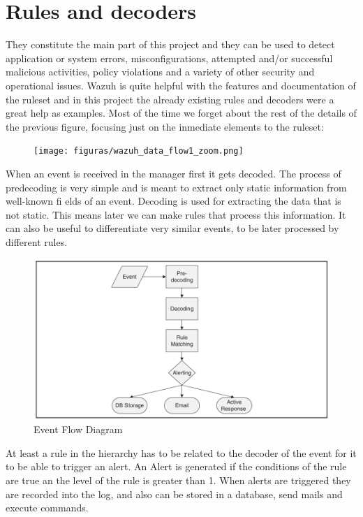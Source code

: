 \section{Rules and decoders}
They constitute the main part of this project and they can be used to detect application or system errors, misconfigurations, attempted and/or successful malicious activities, policy violations and a variety of other security and operational issues\cite{wazuh_index}. Wazuh is quite helpful with the features and documentation of the ruleset and in this project the already existing rules and decoders were a great help as examples.
\linej
\linej
Most of the time we forget about the rest of the details of the previous figure, focusing just on the inmediate elements to the ruleset:
\begin{figure}[H]
  \centering
	\texttt{[image: figuras/wazuh\_data\_flow1\_zoom.png]}
\end{figure}
\linej
When an event is received in the manager first it gets decoded. The process of predecoding is very simple and is meant to extract only static information from well-known fi elds of an event.
Decoding is used for extracting the data that is not static. This means later we can make rules that process this information. It can also be useful to differentiate very similar events, to be later processed by different rules.
\begin{figure}[H]
  \centering
	\includegraphics[width=\textwidth]{figuras/Event_Flow.png}
	\caption{Event Flow Diagram\cite{libro_ossec}}
\end{figure}
\linej
At least a rule in the hierarchy has to be related to the decoder of the event for it to be able to trigger an alert. An Alert is generated if the conditions of the rule are true an the level of the rule is greater than 1.
\linej
When alerts are triggered they are recorded into the log, and also can be stored in a database, send mails and execute commands\cite{libro_ossec}.

